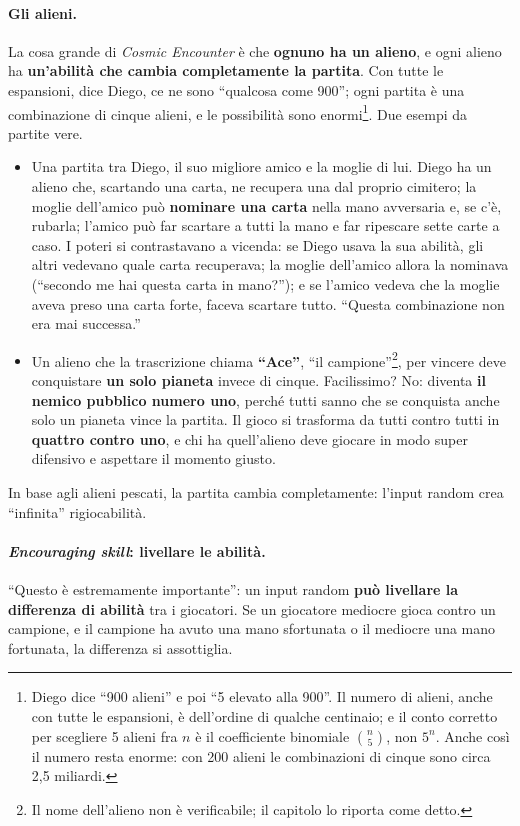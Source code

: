 \paragraph{Gli alieni.} La cosa grande di \emph{Cosmic Encounter} è che \textbf{ognuno ha un
alieno}, e ogni alieno ha \textbf{un'abilità che cambia completamente la partita}. Con tutte
le espansioni, dice Diego, ce ne sono ``qualcosa come 900''; ogni partita è una combinazione
di cinque alieni, e le possibilità sono enormi\footnote{Diego dice ``900 alieni'' e poi ``5
elevato alla 900''. Il numero di alieni, anche con tutte le espansioni, è dell'ordine di
qualche centinaio; e il conto corretto per scegliere 5 alieni fra $n$ è il coefficiente
binomiale $\binom{n}{5}$, non $5^{n}$. Anche così il numero resta enorme: con 200 alieni le
combinazioni di cinque sono circa 2,5 miliardi.}. Due esempi da partite vere.
\begin{itemize}
  \item Una partita tra Diego, il suo migliore amico e la moglie di lui. Diego ha un alieno che,
        scartando una carta, ne recupera una dal proprio cimitero; la moglie dell'amico può
        \textbf{nominare una carta} nella mano avversaria e, se c'è, rubarla; l'amico può far
        scartare a tutti la mano e far ripescare sette carte a caso. I poteri si
        contrastavano a vicenda: se Diego usava la sua abilità, gli altri vedevano quale carta
        recuperava; la moglie dell'amico allora la nominava (``secondo me hai questa carta in
        mano?''); e se l'amico vedeva che la moglie aveva preso una carta forte, faceva
        scartare tutto. ``Questa combinazione non era mai successa.''
  \item Un alieno che la trascrizione chiama \textbf{``Ace''}, ``il campione''\footnote{Il nome
        dell'alieno non è verificabile; il capitolo lo riporta come detto.}, per vincere deve
        conquistare \textbf{un solo pianeta} invece di cinque. Facilissimo? No: diventa
        \textbf{il nemico pubblico numero uno}, perché tutti sanno che se conquista anche solo
        un pianeta vince la partita. Il gioco si trasforma da tutti contro tutti in
        \textbf{quattro contro uno}, e chi ha quell'alieno deve giocare in modo super difensivo
        e aspettare il momento giusto.
\end{itemize}
In base agli alieni pescati, la partita cambia completamente: l'input random crea
``infinita'' rigiocabilità.

\paragraph{\emph{Encouraging skill}: livellare le abilità.} ``Questo è estremamente
importante'': un input random \textbf{può livellare la differenza di abilità} tra i
giocatori. Se un giocatore mediocre gioca contro un campione, e il campione ha avuto una mano
sfortunata o il mediocre una mano fortunata, la differenza si assottiglia.

